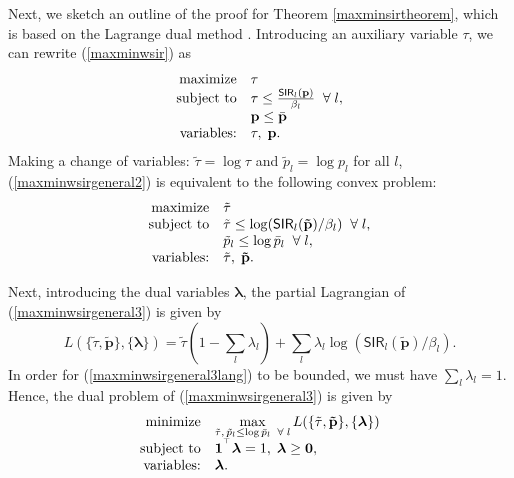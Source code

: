 \documentclass[10pt,twocolumn]{IEEEtran}
\newcommand{\0}{\mathbf{0}}
\newcommand{\1}{\mathbf{1}}
\newcommand{\trans}{^\top}
\begin{document}
Next, we sketch an outline of the proof for Theorem \ref{maxminsirtheorem}, which is based on the Lagrange dual method \cite{Bertsekas99}. Introducing an auxiliary variable $\tau$, we can rewrite (\ref{maxminwsir}) as
\begin{equation}
\label{maxminwsirgeneral2}
\begin{array}
[c]{rl}
\mbox{maximize} & \tau \\
\mbox{subject to} & \tau \le \frac{\mathsf{SIR}_l(\mathbf{p})}{\beta_l} \;\; \forall \; l, \\
& \mathbf{p} \le \bar{\mathbf{p}} \\
\mbox{variables:} & \tau, \; \mathbf{p}.
\end{array}
\end{equation}
Making a change of variables: $\tilde{\tau}=\log \tau$ and $\tilde{p}_l=\log p_l$ for all $l$, (\ref{maxminwsirgeneral2}) is equivalent to the following convex problem:
\begin{equation}
\label{maxminwsirgeneral3}
\begin{array}
[c]{rl}
\mbox{maximize} & \tilde{\tau} \\
\mbox{subject to} & \tilde{\tau} \le \log (\mathsf{SIR}_l(\mathbf{\tilde{p}})/\beta_l) \;\; \forall \; l, \\
& \tilde{p}_l \le \log \bar{p}_l  \;\; \forall \; l, \\
\mbox{variables:} & \tilde{\tau}, \; \mathbf{\tilde{p}}.
\end{array}
\end{equation}

Next, introducing the dual variables $\boldsymbol{\lambda}$, the partial Lagrangian of (\ref{maxminwsirgeneral3}) is given by
\begin{equation}
\label{maxminwsirgeneral3lang}
L(\{\tilde{\tau},\mathbf{\tilde{p}}\},\{\boldsymbol{\lambda}\}) = \tilde{\tau}(1-\sum_l \lambda_l) + \sum_l \lambda_l \log (\mathsf{SIR}_l(\mathbf{\tilde{p}})/\beta_l).
\end{equation}
In order for (\ref{maxminwsirgeneral3lang}) to be bounded, we must have $\sum_l \lambda_l = 1$. Hence, the dual problem of (\ref{maxminwsirgeneral3}) is given by
\begin{equation}
\label{maxminwsirdual1}
\begin{array}
[c]{rl}
\mbox{minimize} & \displaystyle \max_{\tilde{\tau}, \, \tilde{p}_l \le \log \bar{p}_l  \;\; \forall \; l} L(\{\tilde{\tau},\mathbf{\tilde{p}}\},\{\boldsymbol{\lambda}\}) \\
\mbox{subject to} & \mathbf{1}^{\trans} \boldsymbol{\lambda}=1, \; \boldsymbol{\lambda} \ge \mathbf{0},\\
\mbox{variables:} & \boldsymbol{\lambda}.
\end{array}
\end{equation}
\end{document}
